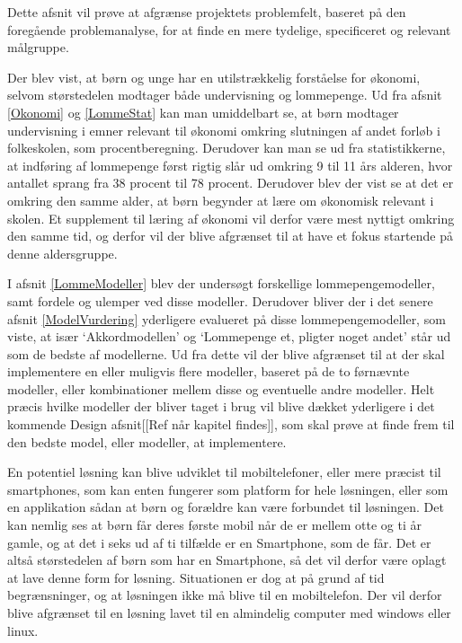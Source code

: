 Dette afsnit vil prøve at afgrænse projektets problemfelt, baseret på den foregående problemanalyse, for at finde en mere tydelige, specificeret og relevant målgruppe.

Der blev vist, at børn og unge har en utilstrækkelig forståelse for økonomi, selvom størstedelen modtager både undervisning og lommepenge. Ud fra afsnit \ref{Okonomi}  og \ref{LommeStat}  kan man umiddelbart se, at børn modtager undervisning i emner relevant til økonomi omkring slutningen af andet forløb i folkeskolen, som procentberegning. Derudover kan man se ud fra statistikkerne, at indføring af lommepenge først rigtig slår ud omkring 9 til 11 års alderen, hvor antallet sprang fra 38 procent til 78 procent. Derudover blev der vist se at det er omkring den samme alder, at børn begynder at lære om økonomisk relevant i skolen. Et supplement til læring af økonomi vil derfor være mest nyttigt omkring den samme tid, og derfor vil der blive afgrænset til at have et fokus startende på denne aldersgruppe.

I afsnit \ref{LommeModeller} blev der undersøgt forskellige lommepengemodeller, samt fordele og ulemper ved disse modeller. Derudover bliver der i det senere afsnit \ref{ModelVurdering} yderligere evalueret på disse lommepengemodeller, som viste, at især ‘Akkordmodellen’ og ‘Lommepenge et, pligter noget andet’ står ud som de bedste af modellerne. Ud fra dette vil der blive afgrænset til at der skal implementere en eller muligvis flere modeller, baseret på de to førnævnte modeller, eller kombinationer mellem disse og eventuelle andre modeller. Helt præcis hvilke modeller der bliver taget i brug vil blive dækket yderligere i det kommende Design afsnit[[Ref når kapitel findes]], som skal prøve at finde frem til den bedste model, eller modeller, at implementere.

En potentiel løsning kan blive udviklet til mobiltelefoner, eller mere præcist til smartphones, som kan enten fungerer som platform for hele løsningen, eller som en applikation sådan at børn og forældre kan være forbundet til løsningen. Det kan nemlig ses at børn får deres første mobil når de er mellem otte og ti år gamle, og at det i seks ud af ti tilfælde er en Smartphone, som de får\cite{BornSmart}. Det er altså størstedelen af børn som har en Smartphone, så det vil derfor være oplagt at lave denne form for løsning. Situationen er dog at på grund af tid begrænsninger, og at løsningen ikke må blive til en mobiltelefon. Der vil derfor blive afgrænset til en løsning lavet til en almindelig computer med windows eller linux.

